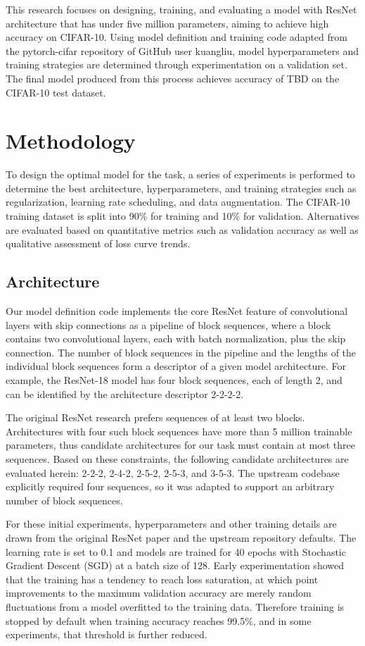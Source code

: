 \documentclass[letterpaper]{article} %
\begin{document}
This research focuses on designing, training, and evaluating a model with ResNet architecture that has under five
million parameters, aiming to achieve high accuracy on CIFAR-10.
Using model definition and training code adapted from the pytorch-cifar repository of GitHub user kuangliu, model
hyperparameters and training strategies are determined through experimentation on a validation set.
The final model produced from this process achieves accuracy of TBD on the CIFAR-10 test dataset.

\section{Methodology}

To design the optimal model for the task, a series of experiments is performed to determine the best architecture,
hyperparameters, and training strategies such as regularization, learning rate scheduling, and data augmentation.
The CIFAR-10 training dataset is split into 90\% for training and 10\% for validation.
Alternatives are evaluated based on quantitative metrics such as validation accuracy as well as qualitative assessment
of loss curve trends.

\subsection{Architecture}

Our model definition code implements the core ResNet feature of convolutional layers with skip connections as a
pipeline of block sequences, where a block contains two convolutional layers, each with batch normalization, plus the
skip connection.
The number of block sequences in the pipeline and the lengths of the individual block sequences form a descriptor of a
given model architecture.
For example, the ResNet-18 model has four block sequences, each of length 2, and can be identified by the architecture
descriptor 2-2-2-2.

The original ResNet research prefers sequences of at least two blocks.
Architectures with four such block sequences have more than 5 million trainable parameters, thus candidate
architectures for our task must contain at most three sequences.
Based on these constraints, the following candidate architectures are evaluated herein: 2-2-2, 2-4-2, 2-5-2, 2-5-3,
and 3-5-3.
The upstream codebase explicitly required four sequences, so it was adapted to support an arbitrary number of block
sequences.

For these initial experiments, hyperparameters and other training details are drawn from the original ResNet paper and
the upstream repository defaults.
The learning rate is set to 0.1 and models are trained for 40 epochs with Stochastic Gradient Descent (SGD) at a batch
size of 128.
Early experimentation showed that the training has a tendency to reach loss saturation, at which point improvements to
the maximum validation accuracy are merely random fluctuations from a model overfitted to the training data.
Therefore training is stopped by default when training accuracy reaches 99.5\%, and in some experiments, that threshold
is further reduced.
\end{document}

